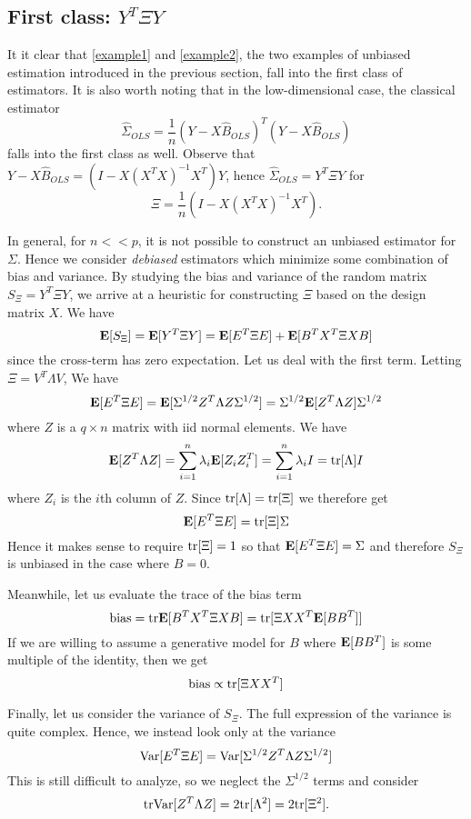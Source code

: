 \documentclass[12pt]{article}
\begin{document}
\subsection{First class: $Y^T \Xi Y$}

It it clear that \eqref{example1} and \eqref{example2}, the two
examples of unbiased estimation introduced in the previous section, fall into the first class of estimators.
It is also worth noting that in the low-dimensional case, the classical estimator
\[
\hat{\Sigma}_{OLS} = \frac{1}{n}(Y - X\hat{B}_{OLS})^T (Y - X\hat{B}_{OLS})
\]
falls into the first class as well.
Observe that $Y - X\hat{B}_{OLS} = (I - X(X^T X)^{-1}X^T) Y$,
hence $\hat{\Sigma}_{OLS} = Y^T \Xi Y$ for
\[
\Xi = \frac{1}{n} (I - X(X^T X)^{-1}X^T).
\]

In general, for $n << p$, it is not possible to construct an unbiased
estimator for $\Sigma$.  Hence we consider \emph{debiased} estimators
which minimize some combination of bias and variance.  By studying the
bias and variance of the random matrix $S_\Xi = Y^T \Xi Y$,
we arrive at a heuristic for constructing $\Xi$ based on the design
matrix $X$.  We have
\[
\textbf{E}[S_\Xi] = \textbf{E}[Y^T \Xi Y] = \textbf{E}[E^T \Xi E] + \textbf{E}[B^T X^T \Xi X B]
\]
since the cross-term has zero expectation.
Let us deal with the first term.
Letting $\Xi = V^T\Lambda V$, We have
\[
\textbf{E}[E^T\Xi E] = \textbf{E}[\Sigma^{1/2} Z^T \Lambda Z \Sigma^{1/2}] = \Sigma^{1/2}\textbf{E}[Z^T \Lambda Z] \Sigma^{1/2}
\]
where $Z$ is a $q \times n$ matrix with iid normal elements.
We have
\[
\textbf{E}[Z^T \Lambda Z] = \sum_{i=1}^n \lambda_i \textbf{E}[Z_i Z_i^T] = \sum_{i=1}^n \lambda_i I = \text{tr}[\Lambda] I
\]
where $Z_i$ is the $i$th column of $Z$.  Since $\text{tr}[\Lambda] = \text{tr}[\Xi]$ we therefore get
\[
\textbf{E}[E^T \Xi E] = \text{tr}[\Xi]\Sigma
\]
Hence it makes sense to require $\text{tr}[\Xi]=1$ so that $\textbf{E}[E^T\Xi E]
= \Sigma$ and therefore $S_\Xi$ is unbiased in the case where $B=0$.

Meanwhile, let us evaluate the trace of the bias term
\[
\text{bias} = \text{tr}\textbf{E}[B^TX^T \Xi X B] = \text{tr}[\Xi XX^T \textbf{E}[B B^T]]
\]
If we are willing to assume a generative model for $B$ where $\textbf{E}[B
B^T]$ is some multiple of the identity, then we get
\[
\text{bias} \propto \text{tr}[\Xi XX^T]
\]

Finally, let us consider the variance of $S_\Xi$.
The full expression of the variance is quite complex.
Hence, we instead look only at the variance
\[
\text{Var}[E^T \Xi E] = \text{Var}[\Sigma^{1/2} Z^T \Lambda Z \Sigma^{1/2}]
\]
This is still difficult to analyze, so we neglect the $\Sigma^{1/2}$ terms and consider
\[
\text{tr}\text{Var}[Z^T \Lambda Z] = 2\text{tr}[\Lambda^2] = 2\text{tr}[\Xi^2].
\]
\end{document}
